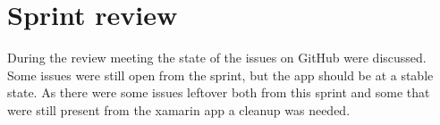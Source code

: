 \section{Sprint review}
During the review meeting the state of the issues on GitHub were discussed.
Some issues were still open from the sprint, but the app should be at a stable state.
As there were some issues leftover both from this sprint and some that were still present from the xamarin app a cleanup was needed.
